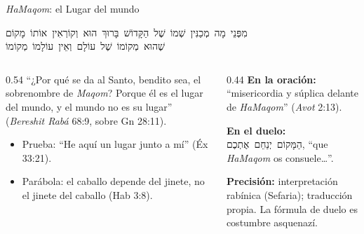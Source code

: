 \documentclass[hyperref={bookmarks=false},aspectratio=169]{beamer}
\newcommand{\heb}[1]{\mbox{\foreignlanguage{hebrew}{#1}}}
\newcommand{\precision}[1]{{\footnotesize\color{gris}\textbf{Precisión:} #1}}
\begin{document}
\begin{frame}{\emph{HaMaqom}: el Lugar del mundo}
\begin{center}\scriptsize\heb{מִפְּנֵי מָה מְכַנִּין שְׁמוֹ שֶׁל הַקָּדוֹשׁ בָּרוּךְ הוּא וְקוֹרְאִין אוֹתוֹ מָקוֹם}\\[1pt]\heb{שֶׁהוּא מְקוֹמוֹ שֶׁל עוֹלָם וְאֵין עוֹלָמוֹ מְקוֹמוֹ}\end{center}
\begin{columns}[t,onlytextwidth]
\begin{column}{0.54\textwidth}\small
``¿Por qué se da al Santo, bendito sea, el sobrenombre de \emph{Maqom}? Porque él es el lugar del mundo, y el mundo no es su lugar'' (\emph{Bereshit Rabá} 68:9, sobre Gn 28:11).
\begin{itemize}
\item Prueba: ``He aquí un lugar junto a mí'' (Éx 33:21).
\item Parábola: el caballo depende del jinete, no el jinete del caballo (Hab 3:8).
\end{itemize}
\end{column}
\begin{column}{0.44\textwidth}\scriptsize
\textbf{En la oración:} ``misericordia y súplica delante de \emph{HaMaqom}'' (\emph{Avot} 2:13).\par\smallskip
\textbf{En el duelo:} \heb{הַמָּקוֹם יְנַחֵם אֶתְכֶם}, ``que \emph{HaMaqom} os consuele\ldots''.\par\smallskip
\precision{interpretación rabínica (Sefaria); traducción propia. La fórmula de duelo es costumbre asquenazí.}
\end{column}
\end{columns}
\end{frame}
\end{document}
